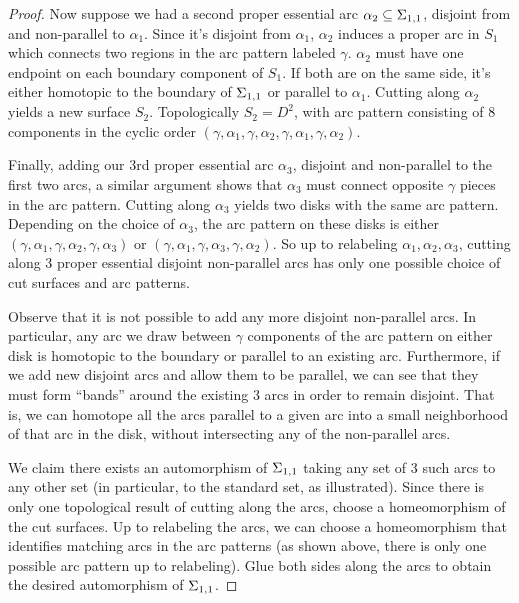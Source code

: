 \begin{proof}
Now suppose we had a second proper essential arc $\alpha_2 \subseteq \Sigma_{1,1}$,
disjoint from and non-parallel to $\alpha_1$. Since it's disjoint from
$\alpha_1$, $\alpha_2$ induces a proper arc in $S_1$ which connects two regions
in the arc pattern labeled $\gamma$.  $\alpha_2$ must have one endpoint on each
boundary component of $S_1$. If both are on the same side, it's either
homotopic to the boundary of $\Sigma_{1,1}$ or parallel to $\alpha_1$. Cutting
along $\alpha_2$ yields a new surface $S_2$. Topologically $S_2=D^2$, with arc
pattern consisting of 8 components in the cyclic order
$(\gamma,\alpha_1,\gamma,\alpha_2,\gamma,\alpha_1,\gamma,\alpha_2)$.

Finally, adding our 3rd proper essential arc $\alpha_3$, disjoint and
non-parallel to the first two arcs, a similar argument shows that $\alpha_3$
must connect opposite $\gamma$ pieces in the arc pattern. Cutting along
$\alpha_3$ yields two disks with the same arc pattern. Depending on the choice
of $\alpha_3$, the arc pattern on these disks is either
$(\gamma,\alpha_1,\gamma,\alpha_2,\gamma,\alpha_3)$ or
$(\gamma,\alpha_1,\gamma,\alpha_3,\gamma,\alpha_2)$. So up to relabeling
$\alpha_1,\alpha_2,\alpha_3$, cutting along 3 proper essential disjoint
non-parallel arcs has only one possible choice of cut surfaces and arc
patterns.

Observe that it is not possible to add any more disjoint non-parallel arcs. In
particular, any arc we draw between $\gamma$ components of the arc pattern on
either disk is homotopic to the boundary or parallel to an existing arc.
Furthermore, if we add new disjoint arcs and allow them to be parallel, we can
see that they must form ``bands'' around the existing 3 arcs in order to remain
disjoint. That is, we can homotope all the arcs parallel to a given arc into
a small neighborhood of that arc in the disk, without intersecting any of the
non-parallel arcs.

We claim there exists an automorphism of $\Sigma_{1,1}$ taking any set of 3 such
arcs to any other set (in particular, to the standard set, as illustrated).
Since there is only one topological result of cutting along the arcs, choose
a homeomorphism of the cut surfaces. Up to relabeling the arcs, we can choose
a homeomorphism that identifies matching arcs in the arc patterns (as shown
above, there is only one possible arc pattern up to relabeling). Glue both
sides along the arcs to obtain the desired automorphism of $\Sigma_{1,1}$.

\end{proof}

